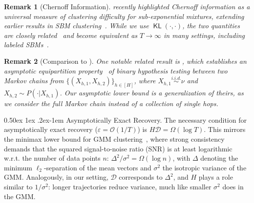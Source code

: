 \documentclass[twoside]{article}
\makeatletter
\renewcommand{\paragraph}{%
  \@startsection{paragraph}{4}%
  {\z@}{0.50ex \@plus 1ex \@minus .2ex}{-1em}%
  {\normalfont\normalsize\bfseries}%
}
\DeclareMathOperator{\KL}{{\mathsf{KL}}}
\def\gD{{\mathcal{D}}}
\def\gO{{\mathcal{O}}}
\theoremstyle{plain}
\newtheorem{remark}{Remark}
\makeatother
\begin{document}
\begin{remark}[Chernoff Information]
    \citet{dreveton2024universal} recently highlighted Chernoff information as a universal measure of clustering difficulty for sub-exponential mixtures, extending earlier results in SBM clustering~\citep{abbe2015sbm1,abbe2015sbm2,dreveton2023sbm}.
    While we use $\KL(\cdot, \cdot)$, the two quantities are closely related~\citep{vanErven2014renyi} and become equivalent as $T \to \infty$ in many settings, including labeled SBMs~\citep[Claim 4]{yun2016labeled}.
\end{remark}

\begin{remark}[Comparison to \citet{wang2023divergence}]
    One notable related result is \citet[Theorem 4.1]{wang2023divergence}, which establishes an asymptotic equipartition property~\citep[Theorem 11.8.1]{infotheory} of binary hypothesis testing between two Markov chains from $\{(X_{h,1},X_{h,2})\}_{h \in [H]}$, where $X_{h,1} \overset{i.i.d.}{\sim} \nu$ and $X_{h,2} \sim P(\cdot | X_{h,1})$.
    Our asymptotic lower bound is a generalization of theirs, as we consider the full Markov chain instead of a collection of single hops.
\end{remark}

\paragraph{Asymptotically Exact Recovery.}
The necessary condition for asymptotically exact recovery ($\varepsilon = \gO(1 / T)$) is $H \gD = \Omega(\log T)$.
This mirrors the minimax lower bound for GMM clustering~\citep[Theorem 3.3]{lu2016gmm}, where strong consistency demands that the squared signal-to-noise ratio (SNR) is at least logarithmic w.r.t. the number of data points $n$: $\Delta^2 / \sigma^2 = \Omega(\log n)$, with $\Delta$ denoting the minimum $\ell_2$-separation of the mean vectors and $\sigma^2$ the isotropic variance of the GMM.
Analogously, in our setting, $\gD$ corresponds to $\Delta^2$, and $H$ plays a role similar to $1 / \sigma^2$: longer trajectories reduce variance, much like smaller $\sigma^2$ does in the GMM.
\end{document}
